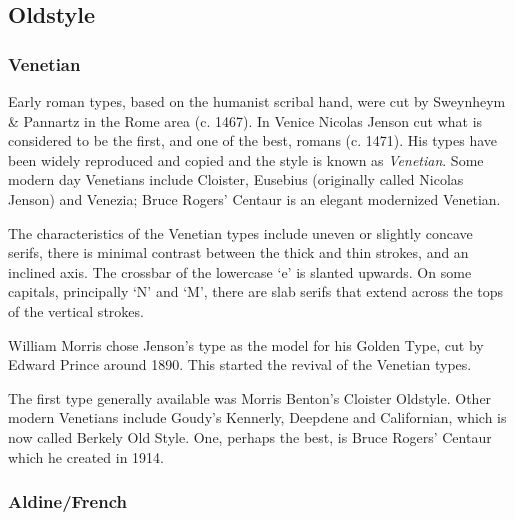 \documentclass[10pt,a4paper,oneside,extrafontsizes]{memoir}%
\begin{document}
\subsection{Oldstyle}

\subsubsection{Venetian}

\begin{paracol}{2}
\switchEng
    Early roman types, based on the humanist scribal hand, were cut by 
Sweynheym \& Pannartz in the Rome area (c. 1467). In Venice Nicolas
Jenson cut what is considered to be the first, 
and one of the best, romans
(c. 1471). His types have been widely reproduced and copied and the style
is known as \emph{Venetian}. Some modern day Venetians
include Cloister, Eusebius (originally
called Nicolas Jenson) and  Venezia; 
Bruce Rogers' Centaur is an elegant 
modernized Venetian.

    The characteristics of the Venetian types include uneven or slightly
concave serifs, there is minimal contrast between the thick and thin 
strokes, and an inclined axis. The crossbar of the lowercase `e' is slanted 
upwards. On some
capitals, principally `N' and `M', there are slab serifs that extend
across the tops of the vertical strokes.
  
    William Morris chose Jenson's 
type as the model
for his Golden Type, cut by Edward 
Prince around 1890. This started the revival of the
Venetian types. 

    The first type generally available was Morris Benton's
Cloister Oldstyle. Other modern Venetians include 
Goudy's Kennerly, 
Deepdene and Californian, which is now
called Berkely Old Style. One, perhaps the best,
is Bruce Rogers' Centaur which he created
in 1914.
\end{paracol}


\subsubsection{Aldine/French}
\end{document}
